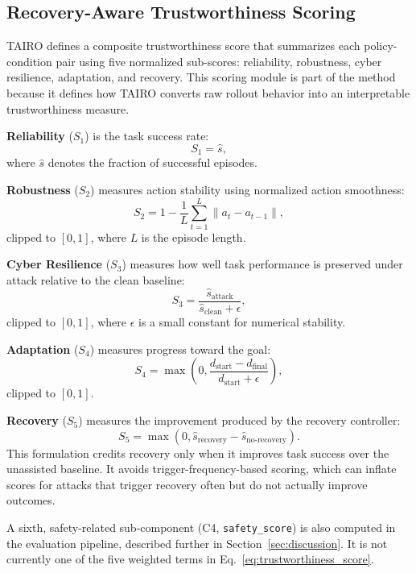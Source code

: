 \documentclass[conference]{IEEEtran}
\begin{document}
\subsection{Recovery-Aware Trustworthiness Scoring}

TAIRO defines a composite trustworthiness score that summarizes each policy-condition
pair using five normalized sub-scores: reliability, robustness, cyber resilience,
adaptation, and recovery. This scoring module is part of the method because it defines
how TAIRO converts raw rollout behavior into an interpretable trustworthiness measure.

\textbf{Reliability} ($S_1$) is the task success rate:
\[
S_1 = \hat{s},
\]
where $\hat{s}$ denotes the fraction of successful episodes.

\textbf{Robustness} ($S_2$) measures action stability using normalized action
smoothness:
\[
S_2 = 1 - \frac{1}{L}\sum_{t=1}^{L}\lVert a_t-a_{t-1}\rVert,
\]
clipped to $[0,1]$, where $L$ is the episode length.

\textbf{Cyber Resilience} ($S_3$) measures how well task performance is preserved under
attack relative to the clean baseline:
\[
S_3 =
\frac{\hat{s}_{\mathrm{attack}}}
{\hat{s}_{\mathrm{clean}}+\epsilon},
\]
clipped to $[0,1]$, where $\epsilon$ is a small constant for numerical stability.

\textbf{Adaptation} ($S_4$) measures progress toward the goal:
\[
S_4 =
\max\left(0,
\frac{d_{\mathrm{start}}-d_{\mathrm{final}}}
{d_{\mathrm{start}}+\epsilon}
\right),
\]
clipped to $[0,1]$.

\textbf{Recovery} ($S_5$) measures the improvement produced by the recovery controller:
\begin{equation}
S_5 =
\max\left(0,\hat{s}_{\mathrm{recovery}} -
\hat{s}_{\mathrm{no\mbox{-}recovery}}\right).
\label{eq:recovery_score}
\end{equation}
This formulation credits recovery only when it improves task success over the
unassisted baseline. It avoids trigger-frequency-based scoring, which can inflate
scores for attacks that trigger recovery often but do not actually improve outcomes.

A sixth, safety-related sub-component (C4, \texttt{safety\_score}) is also computed in
the evaluation pipeline, described further in Section~\ref{sec:discussion}. It is not
currently one of the five weighted terms in Eq.~\ref{eq:trustworthiness_score}.
\end{document}
